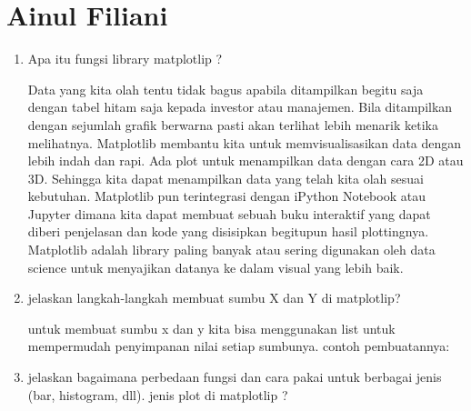 \section{Ainul Filiani}
\begin{enumerate}
\item Apa itu fungsi library matplotlip ?

Data yang kita olah tentu tidak bagus apabila ditampilkan begitu saja dengan tabel hitam saja kepada investor atau manajemen. Bila ditampilkan dengan sejumlah grafik berwarna pasti akan terlihat lebih menarik ketika melihatnya. Matplotlib membantu kita untuk memvisualisasikan data dengan lebih indah dan rapi.
Ada plot untuk menampilkan data dengan cara 2D atau 3D. Sehingga kita dapat menampilkan data yang telah kita olah sesuai kebutuhan. Matplotlib pun terintegrasi dengan iPython Notebook atau Jupyter dimana kita dapat membuat sebuah buku interaktif yang dapat diberi penjelasan dan kode yang disisipkan begitupun hasil plottingnya.
Matplotlib adalah library paling banyak atau sering digunakan oleh data science untuk menyajikan datanya ke dalam visual yang lebih baik.

\item jelaskan langkah-langkah membuat sumbu X dan Y di matplotlip?

untuk membuat sumbu x dan y kita bisa menggunakan list untuk mempermudah penyimpanan nilai setiap sumbunya.
contoh pembuatannya: 


\item jelaskan bagaimana perbedaan fungsi dan cara pakai untuk berbagai jenis (bar, histogram, dll). jenis plot di matplotlip ?  


\end{enumerate}
